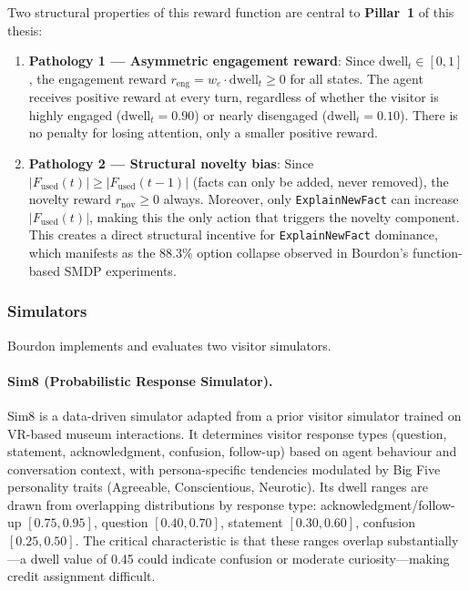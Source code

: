 \documentclass[a4paper, 11pt]{article}
\newcommand{\reng}{r_{\mathrm{eng}}}
\newcommand{\rnov}{r_{\mathrm{nov}}}
\newcommand{\dwell}{\mathrm{dwell}_t}
\newcommand{\Fused}{F_{\mathrm{used}}}
\newcommand{\pillar}[1]{\textbf{Pillar~#1}}
\begin{document}
Two structural properties of this reward function are central to \pillar{1} of this thesis:
\begin{enumerate}
  \item \textbf{Pathology 1 --- Asymmetric engagement reward}: Since $\dwell \in [0,1]$, the engagement reward $\reng = w_e \cdot \dwell \geq 0$ for all states. The agent receives positive reward at every turn, regardless of whether the visitor is highly engaged ($\dwell = 0.90$) or nearly disengaged ($\dwell = 0.10$). There is no penalty for losing attention, only a smaller positive reward.
  \item \textbf{Pathology 2 --- Structural novelty bias}: Since $|\Fused(t)| \geq |\Fused(t-1)|$ (facts can only be added, never removed), the novelty reward $\rnov \geq 0$ always. Moreover, only \texttt{ExplainNewFact} can increase $|\Fused(t)|$, making this the only action that triggers the novelty component. This creates a direct structural incentive for \texttt{ExplainNewFact} dominance, which manifests as the 88.3\% option collapse observed in Bourdon's function-based SMDP experiments.
\end{enumerate}

\subsubsection{Simulators}
\label{sec:bg_simulators_detail}

Bourdon implements and evaluates two visitor simulators.

\paragraph{Sim8 (Probabilistic Response Simulator).} Sim8 is a data-driven simulator adapted from a prior visitor simulator trained on VR-based museum interactions. It determines visitor response types (question, statement, acknowledgment, confusion, follow-up) based on agent behaviour and conversation context, with persona-specific tendencies modulated by Big Five personality traits (Agreeable, Conscientious, Neurotic). Its dwell ranges are drawn from overlapping distributions by response type: acknowledgment/follow-up $[0.75, 0.95]$, question $[0.40, 0.70]$, statement $[0.30, 0.60]$, confusion $[0.25, 0.50]$. The critical characteristic is that these ranges overlap substantially---a dwell value of 0.45 could indicate confusion or moderate curiosity---making credit assignment difficult.
\end{document}
